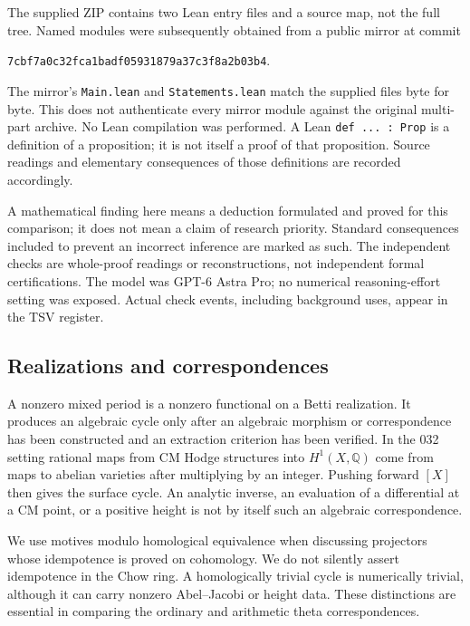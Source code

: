 \documentclass[11pt]{article}
\newcommand{\Q}{\mathbb Q}\newcommand{\C}{\mathbb C}\newcommand{\Z}{\mathbb Z}\newcommand{\R}{\mathbb R}\newcommand{\A}{\mathbb A}\newcommand{\OO}{\mathcal O}
\theoremstyle{definition}\newtheorem{definition}[theorem]{Definition}\newtheorem{remark}[theorem]{Remark}
\begin{document}
The supplied ZIP contains two Lean entry files and a source map, not the full tree. Named modules were subsequently obtained from a public mirror at commit
\begin{center}\small\nolinkurl{7cbf7a0c32fca1badf05931879a37c3f8a2b03b4}.\end{center}
The mirror's \texttt{Main.lean} and \texttt{Statements.lean} match the supplied files byte for byte. This does not authenticate every mirror module against the original multi-part archive. No Lean compilation was performed. A Lean \texttt{def ... : Prop} is a definition of a proposition; it is not itself a proof of that proposition. Source readings and elementary consequences of those definitions are recorded accordingly.

A mathematical finding here means a deduction formulated and proved for this comparison; it does not mean a claim of research priority. Standard consequences included to prevent an incorrect inference are marked as such. The independent checks are whole-proof readings or reconstructions, not independent formal certifications. The model was GPT-6 Astra Pro; no numerical reasoning-effort setting was exposed. Actual check events, including background uses, appear in the TSV register.

\subsection{Realizations and correspondences}
A nonzero mixed period is a nonzero functional on a Betti realization. It produces an algebraic cycle only after an algebraic morphism or correspondence has been constructed and an extraction criterion has been verified. In the 032 setting rational maps from CM Hodge structures into $H^1(X,\Q)$ come from maps to abelian varieties after multiplying by an integer. Pushing forward $[X]$ then gives the surface cycle. An analytic inverse, an evaluation of a differential at a CM point, or a positive height is not by itself such an algebraic correspondence.

We use motives modulo homological equivalence when discussing projectors whose idempotence is proved on cohomology. We do not silently assert idempotence in the Chow ring. A homologically trivial cycle is numerically trivial, although it can carry nonzero Abel--Jacobi or height data. These distinctions are essential in comparing the ordinary and arithmetic theta correspondences.
\end{document}
